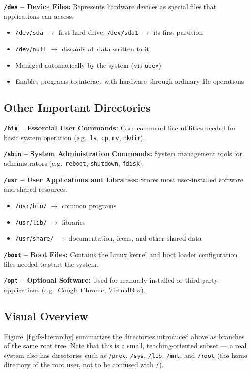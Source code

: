\textbf{\texttt{/dev} -- Device Files:}
Represents hardware devices as special files that applications can access.
\begin{itemize}
    \item \texttt{/dev/sda} $\rightarrow$ first hard drive, \texttt{/dev/sda1} $\rightarrow$ its first partition
    \item \texttt{/dev/null} $\rightarrow$ discards all data written to it
    \item Managed automatically by the system (via \texttt{udev})
    \item Enables programs to interact with hardware through ordinary file operations
\end{itemize}

\subsection{Other Important Directories}
\textbf{\texttt{/bin} -- Essential User Commands:} Core command-line utilities needed for basic system operation (e.g.\ \texttt{ls}, \texttt{cp}, \texttt{mv}, \texttt{mkdir}).

\textbf{\texttt{/sbin} -- System Administration Commands:} System management tools for administrators (e.g.\ \texttt{reboot}, \texttt{shutdown}, \texttt{fdisk}).

\textbf{\texttt{/usr} -- User Applications and Libraries:} Stores most user-installed software and shared resources.
\begin{itemize}
    \item \texttt{/usr/bin/} $\rightarrow$ common programs
    \item \texttt{/usr/lib/} $\rightarrow$ libraries
    \item \texttt{/usr/share/} $\rightarrow$ documentation, icons, and other shared data
\end{itemize}

\textbf{\texttt{/boot} -- Boot Files:} Contains the Linux kernel and boot loader configuration files needed to start the system.

\textbf{\texttt{/opt} -- Optional Software:} Used for manually installed or third-party applications (e.g.\ Google Chrome, VirtualBox).

\subsection{Visual Overview}
Figure~\ref{fig:fs-hierarchy} summarizes the directories introduced above as branches of the same root tree. Note that this is a small, teaching-oriented subset — a real system also has directories such as \texttt{/proc}, \texttt{/sys}, \texttt{/lib}, \texttt{/mnt}, and \texttt{/root} (the home directory of the root user, not to be confused with \texttt{/}).

